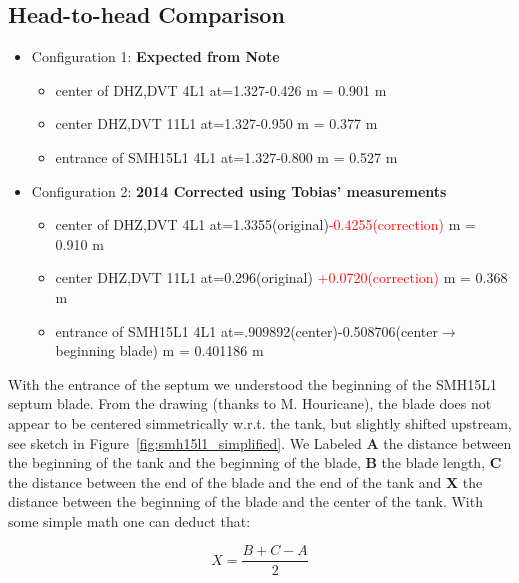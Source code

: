 \documentclass[11pt,letter,english]{article}
\begin{document}
\subsection*{Head-to-head Comparison}

\begin{itemize}

\item Configuration 1: {\bf Expected from Note}
  \begin{itemize}
  \item center of DHZ,DVT 4L1   at=1.327-0.426 m = 0.901 m 
  \item center DHZ,DVT 11L1     at=1.327-0.950 m = 0.377 m 
  \item entrance of SMH15L1 4L1 at=1.327-0.800 m = 0.527 m 
  \end{itemize}

\item Configuration 2: {\bf 2014 Corrected using Tobias' measurements}
  \begin{itemize}
  \item center of DHZ,DVT 4L1   at=1.3355(original)\textcolor{red}{-0.4255(correction)} m = 0.910 m 
  \item center DHZ,DVT 11L1     at=0.296(original) \textcolor{red}{+0.0720(correction)} m = 0.368 m 
  \item entrance of SMH15L1 4L1 at=.909892(center)-0.508706(center$\to$beginning blade) m = 0.401186 m 
  \end{itemize}

\end{itemize}


With the entrance of the septum we understood the beginning of the SMH15L1
septum blade.  From the drawing (thanks to M. Houricane), the blade does not
appear to be centered simmetrically w.r.t. the tank, but slightly shifted
upstream, see sketch in Figure~\ref{fig:smh15l1_simplified}. We Labeled {\bf A}
the distance between the beginning of the tank and the beginning of the
blade, {\bf B} the blade length, {\bf C} the distance between the end of the
blade and the end of the tank and {\bf X} the distance between the beginning of
the blade and the center of the tank. With some simple math one can deduct that:

\begin{equation}
X = \frac{B+C-A}{2}
\end{equation}
\end{document}
